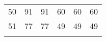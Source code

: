 \begin{table}[!ht]
{\begin{tabularx}{\linewidth}{X<{\centering}SSSSS}
      \num{50}      & 91               & 91               & 60               & 60               & 60               \\
      \num{51}      & 77               & 77               & 49               & 49               & 49               \\
      \bottomrule{}
    \end{tabularx}\label{table:efficiency-generated_table}

  }
\end{table}
